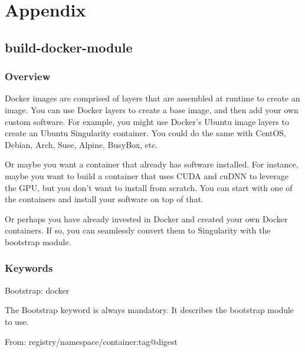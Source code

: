 \documentclass[letterpaper,10pt,english]{sphinxmanual}
\begin{document}
\chapter{Appendix}
\label{\detokenize{appendix:appendix}}\label{\detokenize{appendix::doc}}

\section{build-docker-module}
\label{\detokenize{appendix:build-docker-module}}\label{\detokenize{appendix:id1}}

\subsection{Overview}
\label{\detokenize{appendix:overview}}\label{\detokenize{appendix:sec-build-docker-module}}
Docker images are comprised of layers that are assembled at runtime to create an image. You can use Docker layers to create a base
image, and then add your own custom software. For example, you might use Docker’s Ubuntu image layers to create an Ubuntu Singularity
container. You could do the same with CentOS, Debian, Arch, Suse, Alpine, BusyBox, etc.

Or maybe you want a container that already has software installed. For instance, maybe you want to build a container that uses CUDA
and cuDNN to leverage the GPU, but you don’t want to install from scratch. You can start with one of the  containers and
install your software on top of that.

Or perhaps you have already invested in Docker and created your own Docker containers. If so, you can seamlessly convert them to
Singularity with the  bootstrap module.


\subsection{Keywords}
\label{\detokenize{appendix:keywords}}
%
\begin{sphinxVerbatim}[commandchars=\\\{\}]
Bootstrap: docker
\end{sphinxVerbatim}

The Bootstrap keyword is always mandatory. It describes the bootstrap module to use.

%
\begin{sphinxVerbatim}[commandchars=\\\{\}]
From: \PYGZlt{}registry\PYGZgt{}/\PYGZlt{}namespace\PYGZgt{}/\PYGZlt{}container\PYGZgt{}:\PYGZlt{}tag\PYGZgt{}@\PYGZlt{}digest\PYGZgt{}
\end{sphinxVerbatim}
\end{document}
